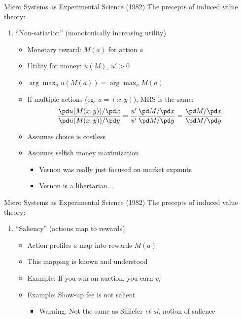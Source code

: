 \begin{frame}{Micro Systems as Experimental Science (1982)}
    The precepts of induced value theory:
    \begin{enumerate}
        \item ``Non-satiation'' (monotonically increasing utility)
        \begin{itemize}
            \item Monetary reward: $M(a)$ for action $a$
            \item Utility for money: $u(M)$, $u'>0$
            \item $\arg\max_a u(M(a)) = \arg\max_a M(a)$
            \item If multiple actions (eg, $a=(x,y)$), MRS is the same:
            $$
            \frac{\pd u(M(x,y))/\pd x}{\pd u(M(x,y))/\pd y} = \frac{u'}{u'} \frac{\pd M/\pd x}{\pd M/\pd y} = \frac{\pd M/\pd x}{\pd M/\pd y}
            $$
            \item Assumes choice is costless
            \item Assumes selfish money maximization
            \begin{itemize}
                \item Vernon was really just focused on market expmnts
                \item Vernon is a libertarian...
            \end{itemize}
        \end{itemize}
        \seti
    \end{enumerate}
\end{frame}

\begin{frame}{Micro Systems as Experimental Science (1982)}
    The precepts of induced value theory:
    \begin{enumerate}
        \conti
        \item ``Saliency'' (actions map to rewards)
        \begin{itemize}
            \item Action profiles $a$ map into rewards $M(a)$
            \item This mapping is known and understood
            \item Example: If you win an auction, you earn $v_i$
            \item Example: Show-up fee is not salient
            \begin{itemize}
                \item Warning: Not the same as Shliefer \textit{et al.} notion of salience
            \end{itemize}
        \end{itemize}
        \seti
    \end{enumerate}
\end{frame}

